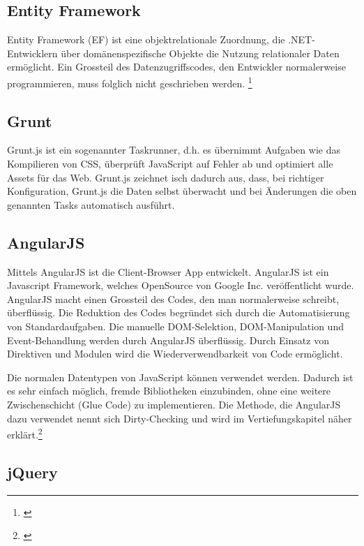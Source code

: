 \subsection{Entity Framework}\label{entity-framework-1}

Entity Framework (EF) ist eine objektrelationale Zuordnung, die
.NET-Entwicklern über domänenspezifische Objekte die Nutzung
relationaler Daten ermöglicht. Ein Grossteil des Datenzugriffscodes, den
Entwickler normalerweise programmieren, muss folglich nicht geschrieben
werden. \footnote{\autocite{efbasic}}

\subsection{Grunt}\label{grunt}

Grunt.js ist ein sogenannter Taskrunner, d.h. es übernimmt Aufgaben wie
das Kompilieren von CSS, überprüft JavaScript auf Fehler ab und
optimiert alle Assets für das Web. Grunt.js zeichnet isch dadurch aus,
dass, bei richtiger Konfiguration, Grunt.js die Daten selbst überwacht
und bei Änderungen die oben genannten Tasks automatisch ausführt.

\subsection{AngularJS}\label{angularjs}

Mittels AngularJS ist die Client-Browser App entwickelt. AngularJS ist
ein Javascript Framework, welches OpenSource von Google Inc.
veröffentlicht wurde. AngularJS macht einen Grossteil des Codes, den man
normalerweise schreibt, überflüssig. Die Reduktion des Codes begründet
sich durch die Automatisierung von Standardaufgaben. Die manuelle
DOM-Selektion, DOM-Manipulation und Event-Behandlung werden durch
AngularJS überflüssig. Durch Einsatz von Direktiven und Modulen wird die
Wiederverwendbarkeit von Code ermöglicht.

Die normalen Datentypen von JavaScript können verwendet werden. Dadurch
ist es sehr einfach möglich, fremde Bibliotheken einzubinden, ohne eine
weitere Zwischenschicht (Glue Code) zu implementieren. Die Methode, die
AngularJS dazu verwendet nennt sich Dirty-Checking und wird im
Vertiefungskapitel näher erklärt.\footnote{\autocite{angularjsbasic}}

\subsection{jQuery}\label{jquery}

